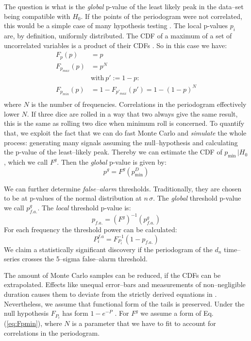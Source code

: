 The question is what is the \emph{global} p-value of the least likely peak in the data--set being compatible with $H_0$. If the points of the periodogram were not correlated, this would be a simple case of many hypothesis testing \cite{Algeri2016}. The local p-values $p_i$ are, by definition, uniformly distributed. The CDF of a maximum of a set of uncorrelated variables is a product of their CDFs . So in this case we have:
\begin{align}
  F_p(p) &= p \\
  F_{p_{max}}(p) &= p^N \\
  &\text{with}\ p' := 1 - p :\\
  F_{p_{min}}(p) &= 1 - F_{p'_{max}}(p') = 1 - (1 - p)^N \label{eq:Fpmin}\\
\end{align}
where $N$ is the number of frequencies. Correlations in the periodogram effectively lower $N$. If three dice are rolled in a way that two always give the same result, this is the same as rolling two dice when minimum roll is concerned. To quantify that, we exploit the fact that we can do fast Monte Carlo and \emph{simulate} the whole process: generating many signals assuming the null--hypothesis and calculating the p-value of the least--likely peak. Thereby we can estimate the CDF of $p_{\mathrm{min}} \, | H_0$, which we call $F^g$. Then the \emph{global} p-value is given by:
\begin{equation}
  p^g = F^g(p_{\mathrm{min}}^D)
\end{equation}

We can further determine \emph{false--alarm} thresholds. Traditionally, they are chosen to be at p-values of the normal distribution at $n \,\sigma$. The \emph{global} threshold p-value we call $p^g_{f.a.}$. The \emph{local} threshold p-value is:
\begin{equation}
  p_{f.a.} = \left( F^g \right)^{-1}(p^g_{f.a.})
\end{equation}
For each frequency the threshold power can be calculated:
\begin{equation}
  P^{f.a}_i = F_{P_i}^{-1}(1 - p_{f.a.})
\end{equation}
We claim a statistically significant discovery if the periodogram of the $d_n$ time--series crosses the 5--sigma false--alarm threshold.

The amount of Monte Carlo samples can be reduced, if the CDFs can be extrapolated. Effects like unequal error--bars and measurements of non--negligible duration causes them to deviate from the strictly derived equations in \cite{Scargle1982}. Nevertheless, we assume that functional form of the tails is preserved. Under the null hypothesis $F_{P_i}$ has form $1 - e^{-P}$ \cite{Scargle1982}. For $F^g$ we assume a form of Eq.\,(\ref{eq:Fpmin}), where $N$ is a parameter that we have to fit to account for correlations in the periodogram.

